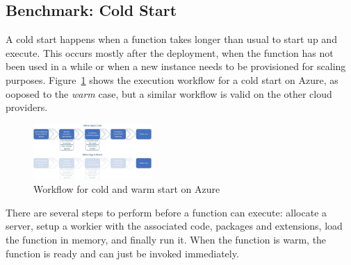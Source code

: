 
\subsection{Benchmark: Cold Start}
\label{sec:coldstart}
A cold start happens when a function takes longer than usual to start up and execute. 
This occurs mostly after the deployment, when the function has not been used in a while  or when a new instance needs to be provisioned for scaling purposes. 
 
Figure~\ref{fig:azure_coldstart} shows the execution workflow for a cold start on Azure, as ooposed to the \emph{warm} case, but a similar workflow is valid on the other cloud providers.
 

\begin{figure}[htp]
\centering
\includegraphics[width=0.4\textwidth]{bilder/azure-coldstart.jpeg}
\caption{Workflow for cold and warm start on Azure~\cite{AzureColdStart}}
\label{fig:azure_coldstart}
\end{figure}

There are several steps to perform before a function can execute: allocate a server, setup a workier with the associated code, packages and extensions, load the function in memory, and finally run it.
When the function is warm, the function is ready and can just be invoked immediately. 

